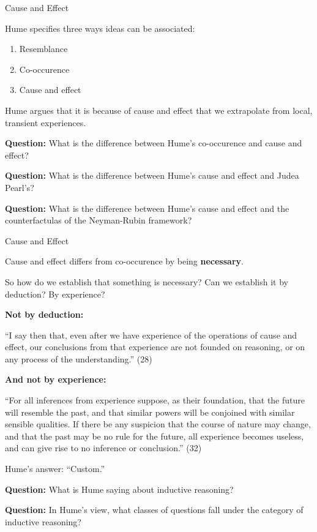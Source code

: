 \documentclass[8pt]{beamer}\usepackage[]{graphicx}\usepackage[]{color}
\begin{document}
\begin{frame}{Cause and Effect}

Hume specifies three ways ideas can be associated:
%
\begin{enumerate}
%
\item Resemblance
\item Co-occurence
\item Cause and effect
%
\end{enumerate}
%
Hume argues that it is because of cause and effect that we extrapolate
from local, transient experiences.

\pause
\textbf{Question:} What is the difference between Hume's co-occurence and
cause and effect?

\pause
\textbf{Question:} What is the difference between Hume's
cause and effect and Judea Pearl's?

\pause
\textbf{Question:} What is the difference between Hume's
cause and effect and the counterfactulas of the Neyman-Rubin framework?

\end{frame}


\begin{frame}{Cause and Effect}

Cause and effect differs from co-occurence by being \textbf{necessary}.

So how do we establish that something is necessary?  Can we establish
it by deduction?  By experience?

\pause
\textbf{Not by deduction:}

\begin{addmargin}[2em]{2em}%
``I say then that, even after we have experience of the operations of
cause and effect, our conclusions from that experience are not founded
on reasoning, or on any process of the understanding.''  (28)
\end{addmargin}

\pause
\textbf{And not by experience:}
\begin{addmargin}[2em]{2em}%
``For all inferences from experience suppose, as their foundation, that
the future will resemble the past, and that similar powers will be conjoined
with similar sensible qualities.  If there be any suspicion that the course
of nature may change, and that the past may be no rule for the future,
all experience becomes useless, and can give rise to no inference
or conclusion.'' (32)
\end{addmargin}

\pause
Hume's answer: ``Custom.''

\pause

\textbf{Question:}  What is Hume saying about inductive reasoning?

\textbf{Question:}  In Hume's view, what classes of questions fall
under the category of inductive reasoning?

\end{frame}
\end{document}
